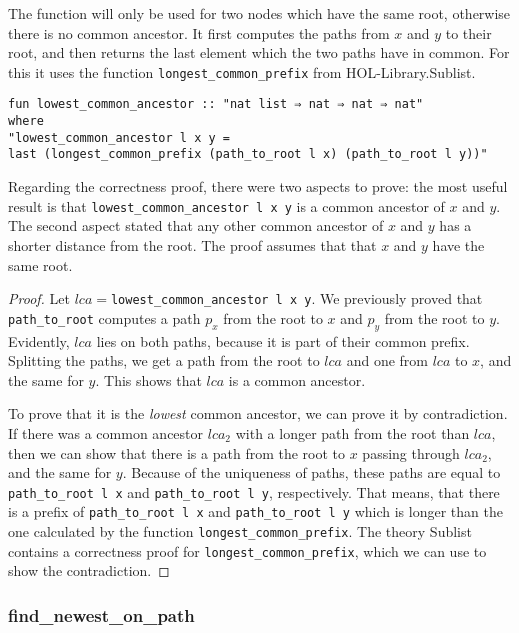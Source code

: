 The function will only be used for two nodes which have the same root, otherwise there is no common ancestor. It first computes the paths from $x$ and $y$ to their root, and then returns the last element which the two paths have in common. For this it uses the function \lstinline{longest_common_prefix} from HOL-Library.Sublist\cite{Sublist}.

\begin{lstlisting}
fun lowest_common_ancestor :: "nat list ⇒ nat ⇒ nat ⇒ nat"
where
"lowest_common_ancestor l x y =
last (longest_common_prefix (path_to_root l x) (path_to_root l y))"
\end{lstlisting}

Regarding the correctness proof, there were two aspects to prove: the most useful result is that \lstinline{lowest_common_ancestor l x y} is a common ancestor of $x$ and $y$. The second aspect stated that any other common ancestor of $x$ and $y$ has a shorter distance from the root. The proof assumes that that $x$ and $y$ have the same root.

\begin{proof}
Let $lca =$\lstinline{lowest_common_ancestor l x y}. We previously proved that \lstinline{path_to_root} computes a path $p_x$ from the root to $x$ and $p_y$ from the root to $y$. Evidently, $lca$ lies on both paths, because it is part of their common prefix. Splitting the paths, we get a path from the root to $lca$ and one from $lca$ to $x$, and the same for $y$. This shows that $lca$ is a common ancestor.

To prove that it is the \emph{lowest} common ancestor, we can prove it by contradiction. If there was a common ancestor $lca_2$ with a longer path from the root than $lca$, then we can show that there is a path from the root to $x$ passing through $lca_2$, and the same for $y$. Because of the uniqueness of paths, these paths are equal to \lstinline{path_to_root l x} and \lstinline{path_to_root l y}, respectively. That means, that there is a prefix of \lstinline{path_to_root l x} and \lstinline{path_to_root l y} which is longer than the one calculated by the function \lstinline{longest_common_prefix}. The theory Sublist\cite{Sublist} contains a correctness proof for \lstinline{longest_common_prefix}, which we can use to show the contradiction.
\end{proof}

\subsubsection{find\_newest\_on\_path}

